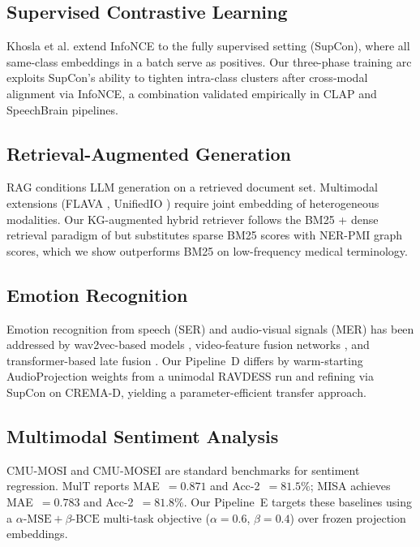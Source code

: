 \documentclass[10pt,conference]{IEEEtran}
\theoremstyle{ieeethm}
\theoremstyle{ieeedef}
\theoremstyle{ieeeremark}
\begin{document}
\subsection{Supervised Contrastive Learning}
Khosla et al. \cite{khosla2020supervised} extend InfoNCE to the fully supervised setting (SupCon), where all same-class embeddings in a batch serve as positives. Our three-phase training arc exploits SupCon's ability to tighten intra-class clusters after cross-modal alignment via InfoNCE, a combination validated empirically in CLAP and SpeechBrain pipelines.

\subsection{Retrieval-Augmented Generation}
RAG \cite{lewis2020retrieval} conditions LLM generation on a retrieved document set. Multimodal extensions (FLAVA \cite{singh2022flava}, UnifiedIO \cite{lu2022unified}) require joint embedding of heterogeneous modalities. Our KG-augmented hybrid retriever follows the BM25 + dense retrieval paradigm of \cite{karpukhin2020dense} but substitutes sparse BM25 scores with NER-PMI graph scores, which we show outperforms BM25 on low-frequency medical terminology.

\subsection{Emotion Recognition}
Emotion recognition from speech (SER) and audio-visual signals (MER) has been addressed by wav2vec-based models \cite{pepino2021emotion}, video-feature fusion networks \cite{zhang2023multimodal}, and transformer-based late fusion \cite{tsai2019multimodal}. Our Pipeline~D differs by warm-starting AudioProjection weights from a unimodal RAVDESS run and refining via SupCon on CREMA-D, yielding a parameter-efficient transfer approach.

\subsection{Multimodal Sentiment Analysis}
CMU-MOSI \cite{zadeh2016mosi} and CMU-MOSEI \cite{zadeh2018multimodal} are standard benchmarks for sentiment regression. MulT \cite{tsai2019multimodal} reports MAE~$= 0.871$ and Acc-2~$= 81.5\%$; MISA \cite{hazarika2020misa} achieves MAE~$= 0.783$ and Acc-2~$= 81.8\%$. Our Pipeline~E targets these baselines using a $\alpha\text{-MSE} + \beta\text{-BCE}$ multi-task objective ($\alpha{=}0.6$, $\beta{=}0.4$) over frozen projection embeddings.
\end{document}
